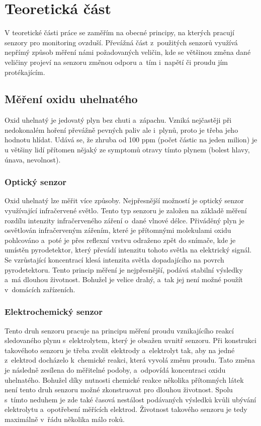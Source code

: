 \chapter{Teoretická část}

V teoretické části práce se zaměřím na obecné principy, na kterých pracují senzory pro monitoring ovzduší. Převážná část z~použitých senzorů využívá nepřímý způsob měření námi požadovaných veličin, kde se většinou změna dané veličiny projeví na senzoru změnou odporu a~tím i~napětí či proudu jím protékajícím.

\section{Měření oxidu uhelnatého}

Oxid uhelnatý je jedovatý plyn bez chuti a~zápachu. Vzniká nejčastěji při nedokonalém hoření převážně pevných paliv ale i~plynů, proto je třeba jeho hodnotu hlídat. Udává se, že zhruba od 100 ppm (počet částic na jeden milion) je u většiny lidí přítomen nějaký ze symptomů otravy tímto plynem (bolest hlavy, únava, nevolnost).

\subsection{Optický senzor}

Oxid uhelnatý lze měřit více způsoby. Nejpřesnější možností je optický senzor využívající infračervené světlo. Tento typ senzoru je založen na základě měření rozdílu intenzity infračerveného záření o~dané vlnové délce. Přiváděný plyn je osvětlován infračerveným zářením, které je přítomnými molekulami oxidu pohlcováno a~poté je přes reflexní vrstvu odraženo zpět do snímače, kde je umístěn pyrodetektor, který převádí intenzitu tohoto světla na elektrický signál. Se vzrůstající koncentrací klesá intenzita světla dopadajícího na povrch pyrodetektoru. Tento princip měření je nejpřesnější, podává stabilní výsledky a~má dlouhou životnost. Bohužel je velice drahý, a~tak jej není možné použít v~domácích zařízeních.

\subsection{Elektrochemický senzor}

Tento druh senzoru pracuje na principu měření proudu vznikajícího reakcí sledovaného plynu s~elektrolytem, který je obsažen uvnitř senzoru. Při konstrukci takovéhoto senzoru je třeba zvolit elektrody a~elektrolyt tak, aby na jedné z~elektrod docházelo k~chemické reakci, která vyvolá změnu proudu. Tato změna je následně zesílena do měřitelné podoby, a~odpovídá koncentraci oxidu uhelnatého. Bohužel díky nutnosti chemické reakce několika přítomných látek není tento druh senzoru možné zkonstruovat pro dlouhou životnost. Spolu s~tímto neduhem je zde také časová nestálost podávaných výsledků kvůli ubývání elektrolytu a~opotřebení měřících elektrod. Životnost takového senzoru je tedy maximálně v~řádu několika málo roků. 

